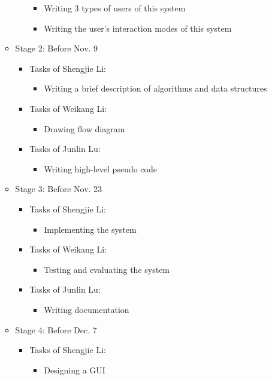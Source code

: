 \begin{itemize}
\begin{itemize}
\begin{itemize}
\begin{itemize}
			\item {Writing 3 types of users of this system}
			\item {Writing the user's interaction modes of this system}
		\end{itemize}
	\end{itemize}
	\item {Stage 2: Before Nov. 9 } 
	\begin{itemize}
		\item {Tasks of Shengjie Li:}
		\begin{itemize}
			\item {Writing a brief description of algorithms and data structures}
		\end{itemize}
		\item {Tasks of Weikang Li:}
		\begin{itemize}
			\item {Drawing flow diagram}
		\end{itemize}
		\item {Tasks of Junlin Lu:}
		\begin{itemize}
			\item {Writing high-level pseudo code}
		\end{itemize}
	\end{itemize}
	\item {Stage 3: Before Nov. 23 } 
	\begin{itemize}
		\item {Tasks of Shengjie Li:}
		\begin{itemize}
			\item {Implementing the system}
		\end{itemize}
		\item {Tasks of Weikang Li:}
		\begin{itemize}
			\item {Testing and evaluating the system}
		\end{itemize}
		\item {Tasks of Junlin Lu:}
		\begin{itemize}
			\item {Writing documentation}
		\end{itemize}
	\end{itemize}
	\item {Stage 4: Before Dec. 7 } 
	\begin{itemize}
		\item {Tasks of Shengjie Li:}
		\begin{itemize}
			\item {Designing a GUI}

\end{itemize}
\end{itemize}
\end{itemize}
\end{itemize}
